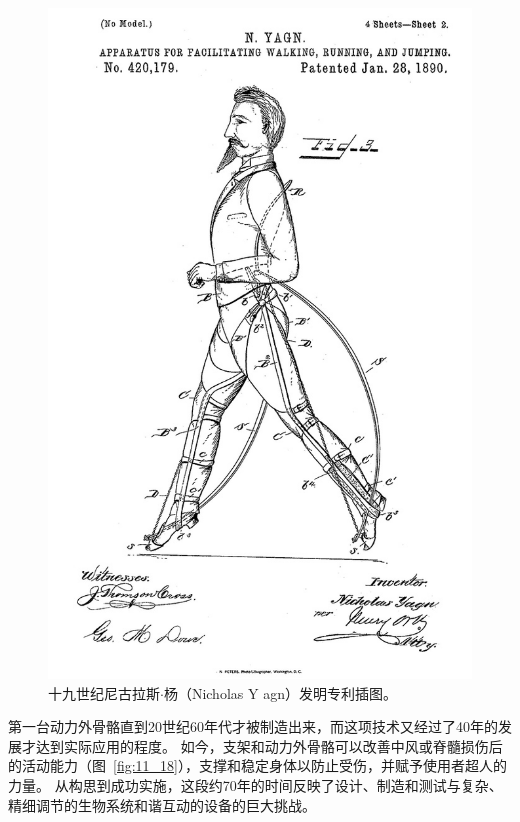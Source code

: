 \begin{figure}[!htb]
	\centering
	\includegraphics[width=0.8\linewidth]{chap11/11_17}
	\caption{十九世纪尼古拉斯$\cdot$杨（Nicholas Y agn）发明专利插图\cite{yagnapparatus}。 \label{fig:11_17}}
\end{figure}


第一台动力外骨骼直到20世纪60年代才被制造出来，而这项技术又经过了40年的发展才达到实际应用的程度。
如今，支架和动力外骨骼可以改善中风或脊髓损伤后的活动能力（图~\ref{fig:11_18}），支撑和稳定身体以防止受伤，并赋予使用者超人的力量。
从构思到成功实施，这段约70年的时间反映了设计、制造和测试与复杂、精细调节的生物系统和谐互动的设备的巨大挑战。


